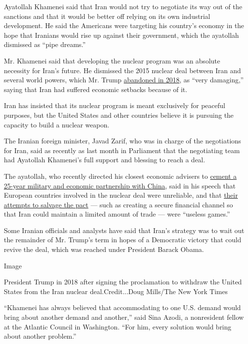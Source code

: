 Ayatollah Khamenei said that Iran would not try to negotiate its way out
of the sanctions and that it would be better off relying on its own
industrial development. He said the Americans were targeting his
country's economy in the hope that Iranians would rise up against their
government, which the ayatollah dismissed as ``pipe dreams.''

Mr. Khamenei said that developing the nuclear program was an absolute
necessity for Iran's future. He dismissed the 2015 nuclear deal between
Iran and several world powers, which Mr. Trump
\href{https://www.nytimes.com/2018/05/08/world/middleeast/trump-iran-nuclear-deal.html}{abandoned
in 2018}, as ``very damaging,'' saying that Iran had suffered economic
setbacks because of it.

Iran has insisted that its nuclear program is meant exclusively for
peaceful purposes, but the United States and other countries believe it
is pursuing the capacity to build a nuclear weapon.

The Iranian foreign minister, Javad Zarif, who was in charge of the
negotiations for Iran, said as recently as last month in Parliament that
the negotiating team had Ayatollah Khamenei's full support and blessing
to reach a deal.

The ayatollah, who recently directed his closest economic advisers to
\href{https://www.nytimes.com/2020/07/11/world/asia/china-iran-trade-military-deal.html}{cement
a 25-year military and economic partnership with China}, said in his
speech that European countries involved in the nuclear deal were
unreliable, and that
\href{https://www.nytimes.com/2020/01/15/world/europe/europe-iran-nuclear-deal.html}{their
attempts to salvage the pact} --- such as creating a secure financial
channel so that Iran could maintain a limited amount of trade --- were
``useless games.''

Some Iranian officials and analysts have said that Iran's strategy was
to wait out the remainder of Mr. Trump's term in hopes of a Democratic
victory that could revive the deal, which was reached under President
Barack Obama.

Image

President Trump in 2018 after signing the proclamation to withdraw the
United States from the Iran nuclear deal.Credit...Doug Mills/The New
York Times

``Khamenei has always believed that accommodating to one U.S. demand
would bring about another demand and another,'' said Sina Azodi, a
nonresident fellow at the Atlantic Council in Washington. ``For him,
every solution would bring about another problem.''

